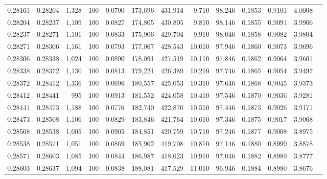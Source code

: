 \begin{tabular}{rrrrrrrrrrrrr}
0.28161 & 0.28204 & 1,328 & 100 &                                     0.0700 & 173,696 & 431,914 &   9,710 &  98,246 & 0.1853 & 0.9101 & 4.0008 \\
0.28204 & 0.28237 & 1,109 & 100 &                                     0.0827 & 174,805 & 430,805 &   9,810 &  98,146 & 0.1855 & 0.9091 & 3.9906 \\
0.28237 & 0.28271 & 1,101 & 100 &                                     0.0833 & 175,906 & 429,704 &   9,910 &  98,046 & 0.1858 & 0.9082 & 3.9804 \\
0.28271 & 0.28306 & 1,161 & 100 &                                     0.0793 & 177,067 & 428,543 &  10,010 &  97,946 & 0.1860 & 0.9073 & 3.9696 \\
0.28306 & 0.28338 & 1,024 & 100 &                                     0.0890 & 178,091 & 427,519 &  10,110 &  97,846 & 0.1862 & 0.9064 & 3.9601 \\
0.28338 & 0.28372 & 1,130 & 100 &                                     0.0813 & 179,221 & 426,389 &  10,210 &  97,746 & 0.1865 & 0.9054 & 3.9497 \\
0.28372 & 0.28412 & 1,336 & 100 &                                     0.0696 & 180,557 & 425,053 &  10,310 &  97,646 & 0.1868 & 0.9045 & 3.9373 \\
0.28412 & 0.28441 &   995 & 100 &                                     0.0913 & 181,552 & 424,058 &  10,410 &  97,546 & 0.1870 & 0.9036 & 3.9281 \\
0.28441 & 0.28473 & 1,188 & 100 &                                     0.0776 & 182,740 & 422,870 &  10,510 &  97,446 & 0.1873 & 0.9026 & 3.9171 \\
0.28473 & 0.28508 & 1,106 & 100 &                                     0.0829 & 183,846 & 421,764 &  10,610 &  97,346 & 0.1875 & 0.9017 & 3.9068 \\
0.28508 & 0.28538 & 1,005 & 100 &                                     0.0905 & 184,851 & 420,759 &  10,710 &  97,246 & 0.1877 & 0.9008 & 3.8975 \\
0.28538 & 0.28571 & 1,051 & 100 &                                     0.0869 & 185,902 & 419,708 &  10,810 &  97,146 & 0.1880 & 0.8999 & 3.8878 \\
0.28571 & 0.28603 & 1,085 & 100 &                                     0.0844 & 186,987 & 418,623 &  10,910 &  97,046 & 0.1882 & 0.8989 & 3.8777 \\
0.28603 & 0.28637 & 1,094 & 100 &                                     0.0838 & 188,081 & 417,529 &  11,010 &  96,946 & 0.1884 & 0.8980 & 3.8676 \\

\end{tabular}
